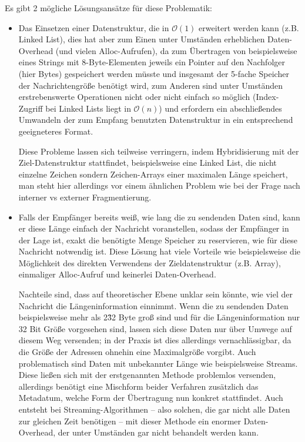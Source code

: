 \begin{description}
\begin{itemize}
        Es gibt 2 mögliche Lösungsansätze für diese Problematik:
        \begin{itemize}
          \item Das Einsetzen einer Datenstruktur, die in $\mathcal{O}(1)$ erweitert werden kann (z.B. Linked List), dies hat aber zum Einen unter Umständen erheblichen Daten-Overhead (und vielen Alloc-Aufrufen), da zum Übertragen von beispielsweise eines Strings mit 8-Byte-Elementen jeweils ein Pointer auf den Nachfolger (hier  Bytes) gespeichert werden müsste und insgesamt der 5-fache Speicher der Nachrichtengröße benötigt wird, zum Anderen sind unter Umständen erstrebenswerte Operationen nicht oder nicht einfach so möglich (Index-Zugriff bei Linked Lists liegt in $\mathcal{O}(n)$) und erfordern ein abschließendes Umwandeln der zum Empfang benutzten Datenstruktur in ein entsprechend geeigneteres Format.

            Diese Probleme lassen sich teilweise verringern, indem Hybridisierung mit der Ziel-Datenstruktur stattfindet, beispielsweise eine Linked List, die nicht einzelne Zeichen sondern Zeichen-Arrays einer maximalen Länge speichert, man steht hier allerdings vor einem ähnlichen Problem wie bei der Frage nach interner vs externer Fragmentierung.
          \item Falls der Empfänger bereits weiß, wie lang die zu sendenden Daten sind, kann er diese Länge einfach der Nachricht voranstellen, sodass der Empfänger in der Lage ist, exakt die benötigte Menge Speicher zu reservieren, wie für diese Nachricht notwendig ist. Diese Lösung hat viele Vorteile wie beispielsweise die Möglichkeit des direkten Verwendens der Zieldatenstruktur (z.B. Array), einmaliger Alloc-Aufruf und keinerlei Daten-Overhead.

            Nachteile sind, dass auf theoretischer Ebene unklar sein könnte, wie viel der Nachricht die Längeninformation einnimmt. Wenn die zu sendenden Daten beispielsweise mehr als 2\^32 Byte groß sind und für die Längeninformation nur 32 Bit Größe vorgesehen sind, lassen sich diese Daten nur über Umwege auf diesem Weg versenden; in der Praxis ist dies allerdings vernachlässigbar, da die Größe der Adressen ohnehin eine Maximalgröße vorgibt. Auch problematisch sind Daten mit unbekannter Länge wie beispielsweise Streams. Diese ließen sich mit der erstgenannten Methode problemlos versenden, allerdings benötigt eine Mischform beider Verfahren zusätzlich das Metadatum, welche Form der Übertragung nun konkret stattfindet. Auch entsteht bei Streaming-Algorithmen -- also solchen, die gar nicht alle Daten zur gleichen Zeit benötigen -- mit dieser Methode ein enormer Daten-Overhead, der unter Umständen gar nicht behandelt werden kann.
        \end{itemize}
    \end{itemize}


\end{description}
